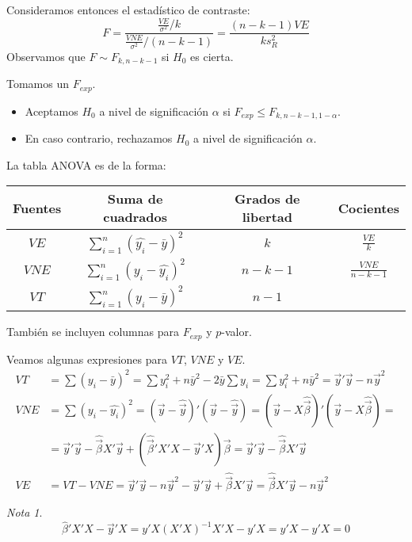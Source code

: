 \documentclass{report}
\theoremstyle{remark}
\theoremstyle{remark}
\newtheorem*{note}{Nota}
\theoremstyle{remark}
\theoremstyle{definition}
\theoremstyle{definition}
\theoremstyle{definition}
\begin{document}
Consideramos entonces el estadístico de contraste:
$$F = \frac{\frac{VE}{\sigma^2} / k}{\frac{VNE}{\sigma^2} / (n-k-1)} = \frac{(n-k-1)VE}{ks_R^2}$$
Observamos que $F \sim F_{k, n-k-1}$ si $H_0$ es cierta.

Tomamos un $F_{exp}$.
\begin{itemize}
    \item Aceptamos $H_0$ a nivel de significación $\alpha$ si $F_{exp} \leq F_{k, n-k-1, 1-\alpha}$.
    \item En caso contrario, rechazamos $H_0$ a nivel de significación $\alpha$.
\end{itemize}

La tabla ANOVA es de la forma:
\begin{center}
    \begin{tabular}{ c | c | c | c }
        Fuentes & Suma de cuadrados                   & Grados de libertad & Cocientes           \\
        \hline
        $VE$    & $\sum_{i=1}^n(\hat{y_i}-\bar{y})^2$ & $k$                & $\frac{VE}{k}$      \\
        $VNE$   & $\sum_{i=1}^n(y_i - \hat{y_i})^2$   & $n-k-1$            & $\frac{VNE}{n-k-1}$ \\
        $VT$    & $\sum_{i=1}^n(y_i - \bar{y})^2$     & $n-1$
    \end{tabular}
\end{center}
También se incluyen columnas para $F_{exp}$ y $p$-valor.

Veamos algunas expresiones para $VT$, $VNE$ y $VE$.
\begin{align*}
    VT  & = \sum (y_i - \bar{y})^2 = \sum y_i^2 + n\bar{y}^2 - 2\bar{y}\sum y_i = \sum y_i^2 + n\bar{y}^2 = \vec{y}'\vec{y} - n\vec{y}^2                     \\
    VNE & = \sum (y_i - \hat{y_i})^2 = (\vec{y} - \hat{\vec{y}})'(\vec{y} - \hat{\vec{y}}) = (\vec{y} - X\hat{\vec{\beta}})'(\vec{y} - X\hat{\vec{\beta}}) = \\
        & = \vec{y}'\vec{y} - \hat{\vec{\beta}}X'\vec{y} + (\hat{\vec{\beta}}'X'X - \vec{y}'X)\vec{\beta} = \vec{y}'\vec{y} - \hat{\vec{\beta}}X'\vec{y}     \\
    VE  & = VT - VNE = \vec{y}'\vec{y} - n\vec{y}^2 - \vec{y}'\vec{y} + \hat{\vec{\beta}}X'\vec{y} = \hat{\vec{\beta}}X'\vec{y} - n\vec{y}^2
\end{align*}

\begin{note}
    $$\hat{\beta}'X'X - \vec{y}'X = y'X(X'X)^{-1}X'X - y'X = y'X - y'X = 0$$
\end{note}
\end{document}

